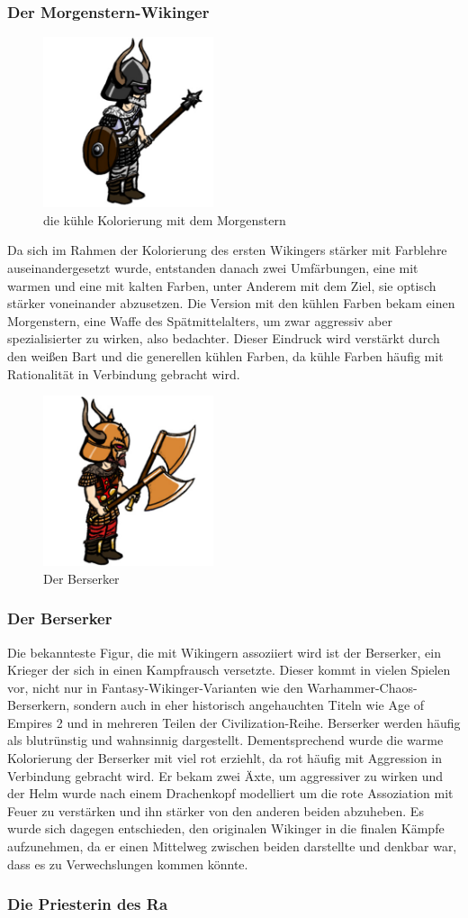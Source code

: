 \documentclass[extern,palatino]{cgBA}
\begin{document}
\subsubsection{Der Morgenstern-Wikinger}
\begin{figure}
	\centering
	\includegraphics[height=5cm]{morningstar.jpg}
	\caption{die kühle Kolorierung mit dem Morgenstern}
\end{figure}
Da sich im Rahmen der Kolorierung des ersten Wikingers stärker mit Farblehre auseinandergesetzt wurde, entstanden danach zwei Umfärbungen, eine mit warmen und eine mit kalten Farben, unter Anderem mit dem Ziel, sie optisch stärker voneinander abzusetzen. Die Version mit den kühlen Farben bekam einen Morgenstern, eine Waffe des Spätmittelalters, um zwar aggressiv aber spezialisierter zu wirken, also bedachter. Dieser Eindruck wird verstärkt durch den weißen Bart und die generellen kühlen Farben, da kühle Farben häufig mit Rationalität in Verbindung gebracht wird.
\newpage
\begin{figure}
	\centering
	\includegraphics[height=5cm]{berserker.jpg}
	\caption{Der Berserker}
\end{figure}
\subsubsection{Der Berserker}
Die bekannteste Figur, die mit Wikingern assoziiert wird ist der Berserker, ein Krieger der sich in einen Kampfrausch versetzte. Dieser kommt in vielen Spielen vor, nicht nur in Fantasy-Wikinger-Varianten wie den Warhammer-Chaos-Berserkern, sondern auch in eher historisch angehauchten Titeln wie Age of Empires 2 und in mehreren Teilen der Civilization-Reihe. Berserker werden häufig als blutrünstig und wahnsinnig dargestellt. Dementsprechend wurde die warme Kolorierung der Berserker mit viel rot erziehlt, da rot häufig mit Aggression in Verbindung gebracht wird. Er bekam zwei Äxte, um aggressiver zu wirken und der Helm wurde nach einem Drachenkopf modelliert um die rote Assoziation mit Feuer zu verstärken und ihn stärker von den anderen beiden abzuheben. Es wurde sich dagegen entschieden, den originalen Wikinger in die finalen Kämpfe aufzunehmen, da er einen Mittelweg zwischen beiden darstellte und denkbar war, dass es zu Verwechslungen kommen könnte.

\newpage
\subsubsection{Die Priesterin des Ra}
\end{document}
